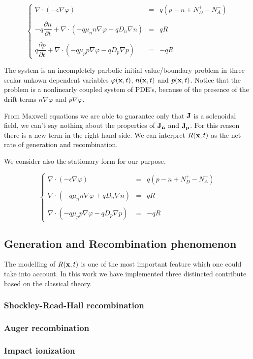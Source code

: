 \begin{equation}
\label{eq: full problem}
\left\{
\begin{array}{rcl}
\nabla \cdot (-\epsilon \nabla \varphi) & = & q(p-n+N_D^+-N_A^-)\\ \\
-q\dfrac{\partial n}{\partial t} + \nabla \cdot ( - q\mu_n n \nabla \varphi + qD_n \nabla n )& = & qR\\ \\
q\dfrac{\partial p}{\partial t} + \nabla \cdot (- q\mu_p p \nabla \varphi - qD_p \nabla p )& = & -qR 
\end{array}
\right.
\end{equation}

The system is an incompletely parbolic initial value/boundary problem in three scalar unkown dependent variables $\varphi(\mathbf{x},t)$, $n(\mathbf{x},t)$ and $p(\mathbf{x},t)$. Notice that the problem is a nonlinearly coupled system of PDE's, because of the presence of the drift terms $n\nabla \varphi$ and $p \nabla 	\varphi$. 

From Maxwell equations we are able to guarantee only that $\mathbf{J}$ is a solenoidal field, we can't say nothing about the properties of $\mathbf{J_n}$ and $\mathbf{J_p}$. For this reason there is a new term in the right hand side. We can interpret $R(\mathbf{x},t)$ as the net rate of generation and recombination.

We consider also the stationary form for our purpose.

\begin{equation}
\label{eq: stationary problem}
\left\{
\begin{array}{rcl}
\nabla \cdot (-\epsilon \nabla \varphi) & = & q(p-n+N_D^+-N_A^-) \\ \\
\nabla \cdot ( - q\mu_n n \nabla \varphi + qD_n \nabla n )& = & qR \\ \\
\nabla \cdot (- q\mu_p p \nabla \varphi - qD_p \nabla p )& = & -qR
\end{array}
\right.
\end{equation}

\subsection{Generation and Recombination phenomenon}

The modelling of $R(\mathbf{x},t)$ is one of the most important feature which one could take into account. In this work we have implemented three distincted contribute based on the classical theory.

\subsubsection{Shockley-Read-Hall recombination}

\subsubsection{Auger recombination}

\subsubsection{Impact ionization}